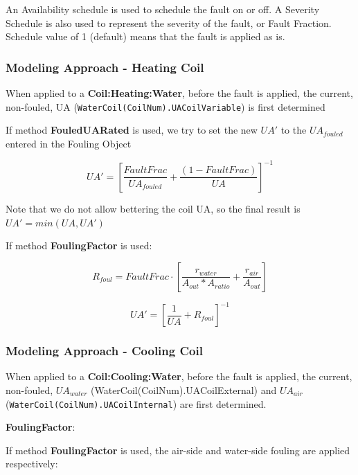 An Availability schedule is used to schedule the fault on or off.
A Severity Schedule is also used to represent the severity of the fault, or Fault Fraction. Schedule value of 1 (default) means that the fault is applied as is.

\subsubsection{Modeling Approach - Heating Coil}\label{modeling-approach-fouling-coil-heating}

When applied to a \textbf{Coil:Heating:Water}, before the fault is applied, the current, non-fouled, UA (\lstinline!WaterCoil(CoilNum).UACoilVariable!) is first determined

If method \textbf{FouledUARated} is used, we try to set the new $UA'$ to the $UA_{fouled}$ entered in the Fouling Object

\begin{equation}
    UA' = [\frac{FaultFrac}{UA_{fouled}}+\frac{(1-FaultFrac)}{UA}]^{-1}
\end{equation}

Note that we do not allow bettering the coil UA, so the final result is $UA' = min(UA, UA')$

If method \textbf{FoulingFactor} is used:

\begin{equation}
    R_{foul} = FaultFrac \cdot [ \frac{r_{water}}{A_{out}*A_{ratio}} + \frac{r_{air}}{A_{out}} ]
\end{equation}

\begin{equation}
    UA' = [\frac{1}{UA} + R_{foul}]^{-1}
\end{equation}

\subsubsection{Modeling Approach - Cooling Coil}\label{modeling-approach-fouling-coil-cooling}

When applied to a \textbf{Coil:Cooling:Water}, before the fault is applied, the current, non-fouled, $UA_{water}$ (WaterCoil(CoilNum).UACoilExternal) and 
$UA_{air}$ (\lstinline!WaterCoil(CoilNum).UACoilInternal!) are first determined.

\textbf{FoulingFactor}:

If method \textbf{FoulingFactor} is used, the air-side and water-side fouling are applied respectively:

